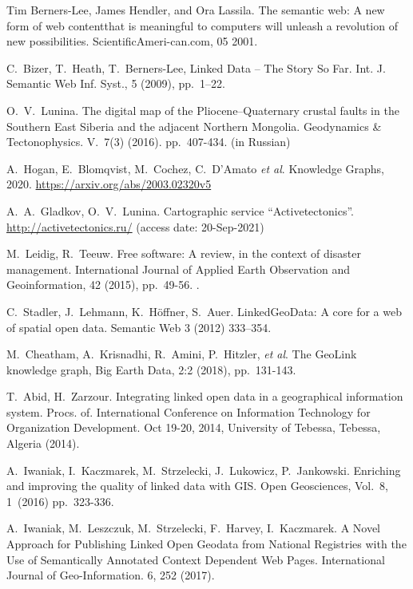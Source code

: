 \documentclass[
]{ceurart}
\begin{document}
\begin{thebibliography}{99}

 Tim Berners-Lee, James Hendler, and Ora Lassila. The semantic web: A new form of web contentthat is meaningful to computers will unleash a revolution of new possibilities. ScientificAmeri-can.com, 05 2001.

 C.~Bizer, T.~Heath, T.~Berners-Lee, Linked Data -- The Story So Far. Int. J. Semantic Web Inf. Syst., 5 (2009), pp.~1--22. 

 O.~V.~Lunina.  The digital map of the Pliocene–Quaternary crustal faults in the Southern East Siberia and the adjacent Northern Mongolia. Geodynamics \& Tectonophysics. V.~7(3) (2016). pp.~407-434. (in Russian) 

 A.~Hogan, E.~Blomqvist, M.~Cochez, C.~D’Amato \emph{et al}. Knowledge Graphs, 2020. \url{https://arxiv.org/abs/2003.02320v5}

 A.~A.~Gladkov, O.~V.~Lunina. Cartographic service ``Activetectonics''. \url{http://activetectonics.ru/} (access date: 20-Sep-2021)

 M.~Leidig, R.~Teeuw. Free software: A review, in the context of disaster management. International Journal of Applied Earth Observation and Geoinformation, 42 (2015), pp.~49-56. .

 C.~Stadler, J.~Lehmann, K.~Höffner, S.~Auer. LinkedGeoData: A core for a web of spatial open data. Semantic Web 3 (2012) 333–354. 

 M.~Cheatham, A.~Krisnadhi, R.~Amini, P.~Hitzler, \emph{et al}. The GeoLink knowledge graph, Big Earth Data, 2:2 (2018), pp.~131-143. 

 T.~Abid, H.~Zarzour. Integrating linked open data in a geographical information system. Procs. of. International Conference on Information Technology for Organization Development. Oct 19-20, 2014, University of Tebessa, Tebessa, Algeria (2014).

 A.~Iwaniak, I.~Kaczmarek, M.~Strzelecki, J.~Lukowicz, P.~Jankowski. Enriching and improving the quality of linked data with GIS. Open Geosciences, Vol.~8, 1~(2016) pp.~323-336. 

 A.~Iwaniak, M.~Leszczuk, M.~Strzelecki, F.~Harvey, I.~Kaczmarek. A Novel Approach for Publishing Linked Open Geodata from National Registries with the Use of Semantically Annotated Context Dependent Web Pages. International Journal of Geo-Information. 6, 252 (2017). 


\end{thebibliography}
\end{document}

